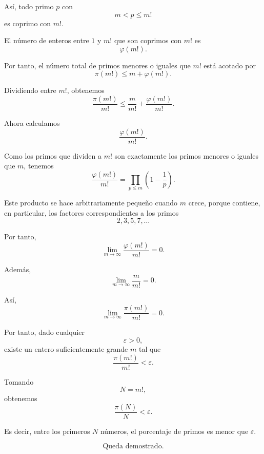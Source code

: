 \documentclass[12pt]{article}
\begin{document}
Así, todo primo \(p\) con
\[
m<p\leq m!
\]
es coprimo con \(m!\).

El número de enteros entre \(1\) y \(m!\) que son coprimos con \(m!\) es
\[
\varphi(m!).
\]

Por tanto, el número total de primos menores o iguales que \(m!\) está acotado por
\[
\pi(m!)\leq m+\varphi(m!).
\]

Dividiendo entre \(m!\), obtenemos
\[
\frac{\pi(m!)}{m!}
\leq
\frac{m}{m!}+\frac{\varphi(m!)}{m!}.
\]

Ahora calculamos
\[
\frac{\varphi(m!)}{m!}.
\]

Como los primos que dividen a \(m!\) son exactamente los primos menores o iguales que \(m\), tenemos
\[
\frac{\varphi(m!)}{m!}
=
\prod_{p\leq m}\left(1-\frac{1}{p}\right).
\]

Este producto se hace arbitrariamente pequeño cuando \(m\) crece, porque contiene, en particular, los factores correspondientes a los primos
\[
2,3,5,7,\dots
\]

Por tanto,
\[
\lim_{m\to\infty}\frac{\varphi(m!)}{m!}=0.
\]

Además,
\[
\lim_{m\to\infty}\frac{m}{m!}=0.
\]

Así,
\[
\lim_{m\to\infty}\frac{\pi(m!)}{m!}=0.
\]

Por tanto, dado cualquier
\[
\varepsilon>0,
\]
existe un entero suficientemente grande \(m\) tal que
\[
\frac{\pi(m!)}{m!}<\varepsilon.
\]

Tomando
\[
N=m!,
\]
obtenemos
\[
\frac{\pi(N)}{N}<\varepsilon.
\]

Es decir, entre los primeros \(N\) números, el porcentaje de primos es menor que \(\varepsilon\).

\[
\boxed{\text{Queda demostrado.}}
\]
\end{document}
